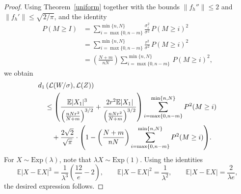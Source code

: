 \documentclass[10pt,a4paper]{amsart}
\newcommand{\E}{\mathbb{E}}
\begin{document}
\begin{proof}
	Using Theorem~\ref{uniform} together with the bounds 
	$\|f_h''\| \le 2$ and $\|f_h'\| \le \sqrt{2/\pi}$, and the identity
	\begin{align*}
		P(M \ge I) 
		&= \sum_{i=\max\{0,n-m\}}^{\min\{n,N\}}  \frac{\sigma_i^2}{\sigma^2} \, P(M \ge i)^2\\&=  \sum_{i=\max\{0,n-m\}}^{\min\{n,N\}} \frac{r^2}{\sigma^2} \, P(M \ge i)^2\\& =  \left( \frac{N+m}{nN}\right)\sum_{i=\max\{0,n-m\}}^{\min\{n,N\}} \, P(M \ge i)^2,
	\end{align*} 
	we obtain \begin{align*} &d_1\left(\mathcal{L}(W/\sigma), \mathcal{L}(Z) \right) \\&\quad \le \left({\E|X_1|^3 \over \left({nNr^2\over N+m}\right)^{3/2}} +{2r^2\E|X_1|\over \left({nNr^2\over N+m}\right)^{3/2}}\right)\sum_{i=\max\{0,n-m\}}^{\min\{n,N\}} P^2(M\ge i)  \\&\quad \quad+{2\sqrt{2} \over \sqrt{\pi}}\cdot\displaystyle{\left(1- \left( \frac{N+m}{nN}\right)\sum_{i=\max\{0,n-m\}}^{\min\{n,N\}} P^2(M\ge i)\right)}.\end{align*}
	For $X\sim \mathrm{Exp}(\lambda)$, note that $\lambda X\sim \mathrm{Exp}(1)$. Using the identities
	\[
	\E|X-\E X|^3 = \frac{1}{\lambda^3}\left(\frac{12}{e}-2\right), \qquad
	\E|X-\E X|^2 = \frac{1}{\lambda^2}, \qquad
	\E|X-\E X| = \frac{2}{\lambda e},
	\]
	the desired expression follows.
\end{proof}
\end{document}
